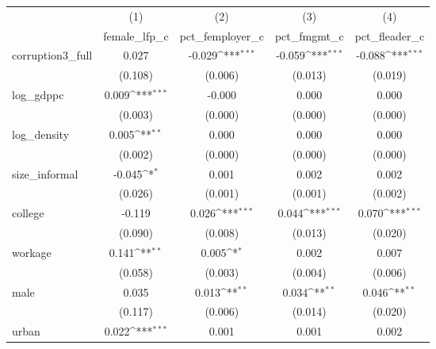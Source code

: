 {
\def\sym#1{\ifmmode^{#1}\else\(^{#1}\)\fi}
\begin{tabular}{l*{4}{c}}
\hline\hline
            &\multicolumn{1}{c}{(1)}&\multicolumn{1}{c}{(2)}&\multicolumn{1}{c}{(3)}&\multicolumn{1}{c}{(4)}\\
            &\multicolumn{1}{c}{female\_lfp\_c}&\multicolumn{1}{c}{pct\_femployer\_c}&\multicolumn{1}{c}{pct\_fmgmt\_c}&\multicolumn{1}{c}{pct\_fleader\_c}\\
\hline
corruption3\_full&       0.027         &      -0.029\sym{***}&      -0.059\sym{***}&      -0.088\sym{***}\\
            &     (0.108)         &     (0.006)         &     (0.013)         &     (0.019)         \\
[1em]
log\_gdppc   &       0.009\sym{***}&      -0.000         &       0.000         &       0.000         \\
            &     (0.003)         &     (0.000)         &     (0.000)         &     (0.000)         \\
[1em]
log\_density &       0.005\sym{**} &       0.000         &       0.000         &       0.000         \\
            &     (0.002)         &     (0.000)         &     (0.000)         &     (0.000)         \\
[1em]
size\_informal&      -0.045\sym{*}  &       0.001         &       0.002         &       0.002         \\
            &     (0.026)         &     (0.001)         &     (0.001)         &     (0.002)         \\
[1em]
college     &      -0.119         &       0.026\sym{***}&       0.044\sym{***}&       0.070\sym{***}\\
            &     (0.090)         &     (0.008)         &     (0.013)         &     (0.020)         \\
[1em]
workage     &       0.141\sym{**} &       0.005\sym{*}  &       0.002         &       0.007         \\
            &     (0.058)         &     (0.003)         &     (0.004)         &     (0.006)         \\
[1em]
male        &       0.035         &       0.013\sym{**} &       0.034\sym{**} &       0.046\sym{**} \\
            &     (0.117)         &     (0.006)         &     (0.014)         &     (0.020)         \\
[1em]
urban       &       0.022\sym{***}&       0.001         &       0.001         &       0.002         \\

\end{tabular}}
